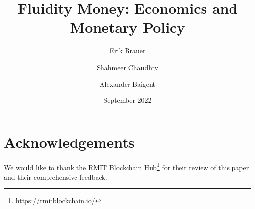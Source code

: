 \documentclass{article}
\title{\vspace{-1.0cm}Fluidity Money: Economics and Monetary Policy}
\author[]{Erik Brauer}
\author[]{Shahmeer Chaudhry}
\author[]{Alexander Baigent}
\affil[]{Fluidity Money}
\date{September 2022}
\theoremstyle{definition}
\begin{document}
\maketitle





\newpage



\newpage



\newpage



\newpage



\newpage



\newpage

\section*{Acknowledgements}

We would like to thank the RMIT Blockchain Hub\footnote{\url{https://rmitblockchain.io/}} for their review of this paper and their comprehensive feedback.

\newpage

\printbibliography
\end{document}
